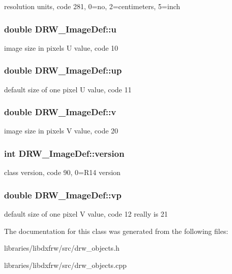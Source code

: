 resolution units, code 281, 0=no, 2=centimeters, 5=inch \hypertarget{classDRW__ImageDef_afe11ccfebf55c9ec07a92cda8f09d98c}{
\subsubsection[{u}]{\setlength{\rightskip}{0pt plus 5cm}double D\-R\-W\-\_\-\-Image\-Def\-::u}}\label{classDRW__ImageDef_afe11ccfebf55c9ec07a92cda8f09d98c}
image size in pixels U value, code 10 \hypertarget{classDRW__ImageDef_ad33a25f477e0448bae9a74fc902efafc}{
\subsubsection[{up}]{\setlength{\rightskip}{0pt plus 5cm}double D\-R\-W\-\_\-\-Image\-Def\-::up}}\label{classDRW__ImageDef_ad33a25f477e0448bae9a74fc902efafc}
default size of one pixel U value, code 11 \hypertarget{classDRW__ImageDef_a25c16e07b7d0887cf71f4d276b58217c}{
\subsubsection[{v}]{\setlength{\rightskip}{0pt plus 5cm}double D\-R\-W\-\_\-\-Image\-Def\-::v}}\label{classDRW__ImageDef_a25c16e07b7d0887cf71f4d276b58217c}
image size in pixels V value, code 20 \hypertarget{classDRW__ImageDef_a2f47b0e3ad2e33f750bbe97d3e30ceaf}{
\subsubsection[{version}]{\setlength{\rightskip}{0pt plus 5cm}int D\-R\-W\-\_\-\-Image\-Def\-::version}}\label{classDRW__ImageDef_a2f47b0e3ad2e33f750bbe97d3e30ceaf}
class version, code 90, 0=R14 version \hypertarget{classDRW__ImageDef_a95e92947b72818845b6cd9fe0c9add8a}{
\subsubsection[{vp}]{\setlength{\rightskip}{0pt plus 5cm}double D\-R\-W\-\_\-\-Image\-Def\-::vp}}\label{classDRW__ImageDef_a95e92947b72818845b6cd9fe0c9add8a}
default size of one pixel V value, code 12 really is 21 

The documentation for this class was generated from the following files\-:\begin{DoxyCompactItemize}
\item 
libraries/libdxfrw/src/drw\-\_\-objects.\-h\item 
libraries/libdxfrw/src/drw\-\_\-objects.\-cpp\end{DoxyCompactItemize}
